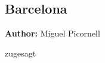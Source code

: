 \subsection{Barcelona}
\label{ch:scenarios:barcelona}
\hfill \textbf{Author:} Miguel Picornell

zugesagt

